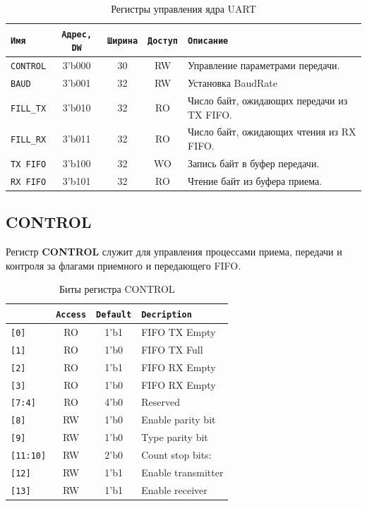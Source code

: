\documentclass[a4paper,12pt]{article}
\begin{document}
\begin{table}[H]
  \begin{center}
    \begin{tabular}{l|c|c|c|l}
      \rowcolor[gray]{0.7} {\tt Имя} & {\tt Адрес, DW} & {\tt Ширина} & {\tt Доступ} & {\tt Описание} \\ \hline \hline
      {\tt CONTROL}   & 3'b000 & 30 & RW & Управление параметрами передачи.\\ \hline
      {\tt BAUD}      & 3'b001 & 32 & RW & Установка BaudRate\\ \hline
      {\tt FILL\_TX}  & 3'b010 & 32 & RO & Число байт, ожидающих передачи из TX FIFO.\\ \hline
      {\tt FILL\_RX}  & 3'b011 & 32 & RO & Число байт, ожидающих чтения из RX FIFO.\\ \hline
      {\tt TX FIFO}   & 3'b100 & 32 & WO & Запись байт в буфер передачи.\\ \hline
      {\tt RX FIFO}   & 3'b101 & 32 & RO & Чтение байт из буфера приема.\\ \hline
    \end{tabular}
    \caption{Регистры управления ядра UART}
    \label{tbl:uart_regs}
    \end{center}
\end{table}

\subsection{CONTROL}

Регистр \textbf{CONTROL} служит для управления процессами приема, передачи и контроля за флагами приемного и передающего FIFO.

\begin{table}[H]
  \begin{center}
    \begin{tabular}{l|c|c|l}
      \rowcolor[gray]{0.7}{\tt Bit} & {\tt Access} & {\tt Default} & {\tt Decription} \\\hline\hline
      {\tt [0]} & RO & 1'b1 & FIFO TX Empty \\ \hline
      {\tt [1]} & RO & 1'b0 & FIFO TX Full \\ \hline
      {\tt [2]} & RO & 1'b1 & FIFO RX Empty \\ \hline
      {\tt [3]} & RO & 1'b0 & FIFO RX Empty \\ \hline
      {\tt [7:4]} & RO & 4'b0 & Reserved \\ \hline

      {\tt [8]} & RW & 1'b0 & Enable parity bit \\ \hline
      {\tt [9]} & RW & 1'b0 & Type parity bit\\ \hline
      {\tt [11:10]} & RW & 2'b0 & Count stop bits: \\ \hline

      {\tt [12]} & RW & 1'b1 & Enable transmitter \\ \hline
      {\tt [13]} & RW & 1'b1 & Enable receiver \\ \hline
    \end{tabular}
    \caption{Биты регистра CONTROL}
    \label{tbl:control_bits}
    \end{center}
\end{table}
\end{document}
